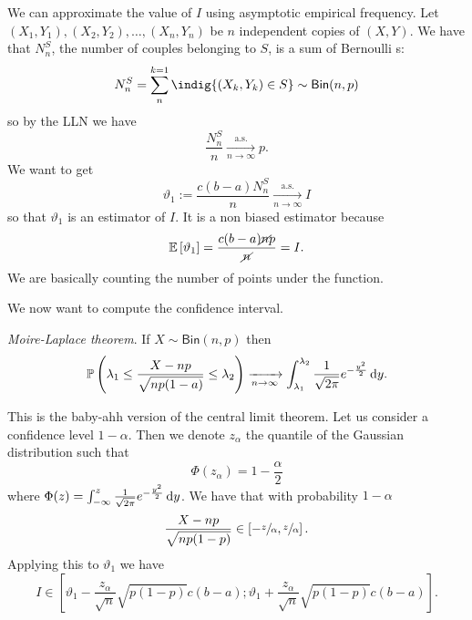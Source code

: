 \documentclass[12pt]{report}
\begin{document}
We can approximate the value of $I$ using asymptotic empirical frequency. Let $(X_1,Y_1),(X_2,Y_2),\ldots,(X_n,Y_n)$ be $n$ independent copies of $(X,Y)$. We have that $N^{S}_{n}$, the number of couples belonging to $S$,  is a sum of Bernoulli \rv s:
\begin{equation*}
	N^{S}_{n}=\sum_{n}^{k=1}\indig{(X_{k},Y_k)\in S}\sim\mathsf{Bin}(n,p)
\end{equation*}
so by the LLN we have
\begin{equation*}
	\frac{N_{n}^{S}}{n}\xrightarrow[n\to\infty]{\mathrm{a.s.}}p.
\end{equation*}
We want to get
\begin{equation*}
	\vartheta_{1}:=\frac{c(b-a)N^{S}_{n}}{n}\xrightarrow[n\to\infty]{\mathrm{a.s.}}I
\end{equation*}
so that $\vartheta_{1}$ is an estimator of $I$. It is a non biased estimator because
\begin{equation*}
	\mathbb{E}\left[\vartheta_{1}\right]=\frac{c(b-a)\cancel{n}p}{\cancel{n}}=I.
\end{equation*}
We are basically counting the number of points under the function. \par
We now want to compute the confidence interval.
\begin{theorem}
	\emph{Moire-Laplace theorem}. If $X\sim\mathsf{Bin}(n,p)$ then
	\begin{equation*}
		\mathbb{P}\left(\lambda_1\leq\frac{X-np}{\sqrt{np(1-a)}}\leq\lambda_2\right)\xrightarrow[n\to\infty]{}\int_{\lambda_1}^{\lambda_2}\frac{1}{\sqrt{2\pi}}e^{-\frac{y^{2}}{2}}\mathop{}\!\mathrm{d} y.
	\end{equation*}
\end{theorem}
This is the baby-ahh version of the central limit theorem. Let us consider a confidence level $1-\alpha$. Then we denote $z_\alpha$ the quantile of the Gaussian distribution such that
\begin{equation*}
	\Phi(z_\alpha)=1-\frac{\alpha}{2}
\end{equation*}
where $\Phi(z)=\int_{-\infty}^{z}\frac{1}{\sqrt{2\pi}}e^{-\frac{y^{2}}{2}}\mathop{}\!\mathrm{d} y$. We have that with probability $1-\alpha$
\begin{equation*}
	\frac{X-np}{\sqrt{np(1-p)}}\in\left[-\sfrac{z}{\alpha},\sfrac{z}{\alpha}\right].
\end{equation*}
Applying this to $\vartheta_{1}$ we have
\begin{equation*}
	I\in\left[\vartheta_1-\frac{z_\alpha}{\sqrt{n}}\sqrt{p(1-p)}c(b-a);\vartheta_1+\frac{z_\alpha}{\sqrt{n}}\sqrt{p(1-p)}c(b-a)\right].
\end{equation*}
\end{document}
